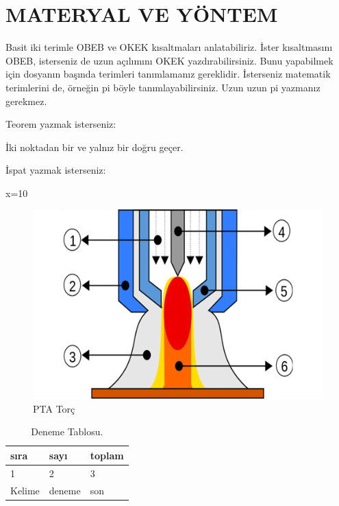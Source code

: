 \chapter{MATERYAL VE YÖNTEM}

Basit iki terimle \acrfull{OBEB} ve \acrfull{OKEK} kısaltmaları anlatabiliriz. İster kısaltmasını \acrshort{OBEB}, isterseniz de uzun açılımını \acrlong{OKEK} yazdırabilirsiniz. Bunu yapabilmek için dosyanın başında terimleri tanımlamanız gereklidir. İsterseniz matematik terimlerini de, örneğin \acrshort{pi} böyle tanımlayabilirsiniz. Uzun uzun \acrfull{pi} yazmanız gerekmez. 

Teorem yazmak isterseniz:
\begin{theorem}[Öklid]
 İki noktadan bir ve yalnız bir doğru geçer.
\end{theorem}

İspat yazmak isterseniz:
\begin{ispat}
x=10
\end{ispat}
\lipsum[1-2]
\begin{figure}[h]
\centering
\includegraphics[width=\textwidth]{gorseller/ptaTorc}
\caption{PTA Torç}\label{fig:PtaTorc1}
\end{figure}
\lipsum[1-2]
\begin{table}
\centering
\caption{Deneme Tablosu.}\label{tab:den1}
\begin{tabular}{|l|l|l|}
\hline
sıra   & sayı   & toplam \\ \hline
1      & 2      & 3      \\ \hline
Kelime & deneme & son    \\ \hline
\end{tabular}
\end{table}


